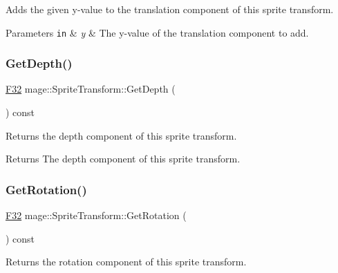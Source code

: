 Adds the given y-\/value to the translation component of this sprite transform.


\begin{DoxyParams}[1]{Parameters}
\mbox{\tt in}  & {\em y} & The y-\/value of the translation component to add. \\
\hline
\end{DoxyParams}
\mbox{\label{classmage_1_1_sprite_transform_acbb61149d34be717c43a78fc9113fe9c}} 
\subsubsection{\texorpdfstring{Get\+Depth()}{GetDepth()}}
{\footnotesize\ttfamily \mbox{\hyperlink{namespacemage_aa97e833b45f06d60a0a9c4fc22ae02c0}{F32}} mage\+::\+Sprite\+Transform\+::\+Get\+Depth (\begin{DoxyParamCaption}{ }\end{DoxyParamCaption}) const\hspace{0.3cm}{\ttfamily [noexcept]}}

Returns the depth component of this sprite transform.

\begin{DoxyReturn}{Returns}
The depth component of this sprite transform. 
\end{DoxyReturn}
\mbox{\label{classmage_1_1_sprite_transform_ae7fc2e36ce99ea41a74d53032437dd58}} 
\subsubsection{\texorpdfstring{Get\+Rotation()}{GetRotation()}}
{\footnotesize\ttfamily \mbox{\hyperlink{namespacemage_aa97e833b45f06d60a0a9c4fc22ae02c0}{F32}} mage\+::\+Sprite\+Transform\+::\+Get\+Rotation (\begin{DoxyParamCaption}{ }\end{DoxyParamCaption}) const\hspace{0.3cm}{\ttfamily [noexcept]}}

Returns the rotation component of this sprite transform.

